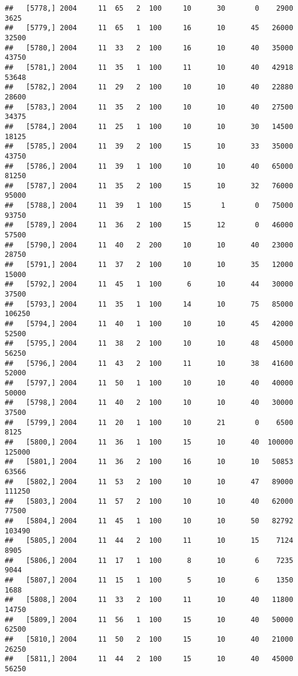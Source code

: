 \documentclass{article}\usepackage[]{graphicx}\usepackage[]{color}
\makeatletter
\newenvironment{kframe}{%
 \def\at@end@of@kframe{}%
 \ifinner\ifhmode%
  \def\at@end@of@kframe{\end{minipage}}%
  \begin{minipage}{\columnwidth}%
 \fi\fi%
 \def\FrameCommand##1{\hskip\@totalleftmargin \hskip-\fboxsep
 \colorbox{shadecolor}{##1}\hskip-\fboxsep
     \hskip-\linewidth \hskip-\@totalleftmargin \hskip\columnwidth}%
 \MakeFramed {\advance\hsize-\width
   \@totalleftmargin\z@ \linewidth\hsize
   \@setminipage}}%
 {\par\unskip\endMakeFramed%
 \at@end@of@kframe}
\newenvironment{knitrout}{}{} %
\makeatother
\begin{document}
\begin{knitrout}
\begin{kframe}
\begin{verbatim}
##   [5778,] 2004     11  65   2  100     10      30       0    2900    3625
##   [5779,] 2004     11  65   1  100     16      10      45   26000   32500
##   [5780,] 2004     11  33   2  100     16      10      40   35000   43750
##   [5781,] 2004     11  35   1  100     11      10      40   42918   53648
##   [5782,] 2004     11  29   2  100     10      10      40   22880   28600
##   [5783,] 2004     11  35   2  100     10      10      40   27500   34375
##   [5784,] 2004     11  25   1  100     10      10      30   14500   18125
##   [5785,] 2004     11  39   2  100     15      10      33   35000   43750
##   [5786,] 2004     11  39   1  100     10      10      40   65000   81250
##   [5787,] 2004     11  35   2  100     15      10      32   76000   95000
##   [5788,] 2004     11  39   1  100     15       1       0   75000   93750
##   [5789,] 2004     11  36   2  100     15      12       0   46000   57500
##   [5790,] 2004     11  40   2  200     10      10      40   23000   28750
##   [5791,] 2004     11  37   2  100     10      10      35   12000   15000
##   [5792,] 2004     11  45   1  100      6      10      44   30000   37500
##   [5793,] 2004     11  35   1  100     14      10      75   85000  106250
##   [5794,] 2004     11  40   1  100     10      10      45   42000   52500
##   [5795,] 2004     11  38   2  100     10      10      48   45000   56250
##   [5796,] 2004     11  43   2  100     11      10      38   41600   52000
##   [5797,] 2004     11  50   1  100     10      10      40   40000   50000
##   [5798,] 2004     11  40   2  100     10      10      40   30000   37500
##   [5799,] 2004     11  20   1  100     10      21       0    6500    8125
##   [5800,] 2004     11  36   1  100     15      10      40  100000  125000
##   [5801,] 2004     11  36   2  100     16      10      10   50853   63566
##   [5802,] 2004     11  53   2  100     10      10      47   89000  111250
##   [5803,] 2004     11  57   2  100     10      10      40   62000   77500
##   [5804,] 2004     11  45   1  100     10      10      50   82792  103490
##   [5805,] 2004     11  44   2  100     11      10      15    7124    8905
##   [5806,] 2004     11  17   1  100      8      10       6    7235    9044
##   [5807,] 2004     11  15   1  100      5      10       6    1350    1688
##   [5808,] 2004     11  33   2  100     11      10      40   11800   14750
##   [5809,] 2004     11  56   1  100     15      10      40   50000   62500
##   [5810,] 2004     11  50   2  100     15      10      40   21000   26250
##   [5811,] 2004     11  44   2  100     15      10      40   45000   56250

\end{verbatim}
\end{kframe}
\end{knitrout}
\end{document}

